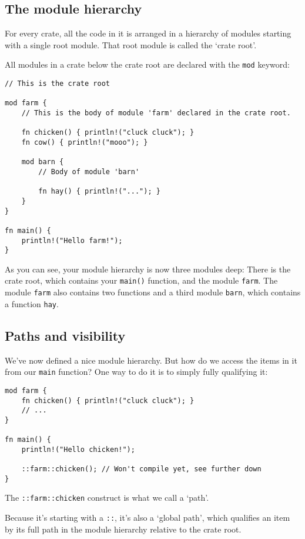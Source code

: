 \documentclass[]{article}
\begin{document}
\subsection{The module hierarchy}\label{the-module-hierarchy}

For every crate, all the code in it is arranged in a hierarchy of
modules starting with a single root module. That root module is called
the `crate root'.

All modules in a crate below the crate root are declared with the
\texttt{mod} keyword:

\begin{verbatim}
// This is the crate root

mod farm {
    // This is the body of module 'farm' declared in the crate root.

    fn chicken() { println!("cluck cluck"); }
    fn cow() { println!("mooo"); }

    mod barn {
        // Body of module 'barn'

        fn hay() { println!("..."); }
    }
}

fn main() {
    println!("Hello farm!");
}
\end{verbatim}

As you can see, your module hierarchy is now three modules deep: There
is the crate root, which contains your \texttt{main()} function, and the
module \texttt{farm}. The module \texttt{farm} also contains two
functions and a third module \texttt{barn}, which contains a function
\texttt{hay}.

\subsection{Paths and visibility}\label{paths-and-visibility}

We've now defined a nice module hierarchy. But how do we access the
items in it from our \texttt{main} function? One way to do it is to
simply fully qualifying it:

\begin{verbatim}
mod farm {
    fn chicken() { println!("cluck cluck"); }
    // ...
}

fn main() {
    println!("Hello chicken!");

    ::farm::chicken(); // Won't compile yet, see further down
}
\end{verbatim}

The \texttt{::farm::chicken} construct is what we call a `path'.

Because it's starting with a \texttt{::}, it's also a `global path',
which qualifies an item by its full path in the module hierarchy
relative to the crate root.
\end{document}

